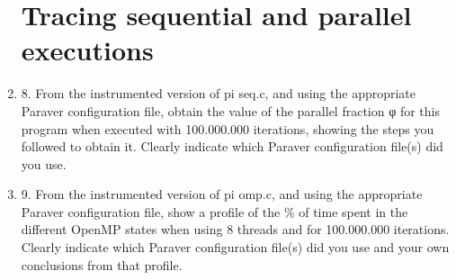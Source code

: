 \documentclass[12pt]{article}
\begin{document}
\begin{enumerate}
\section* {Tracing sequential and parallel executions}


\item[] 8. From the instrumented version of pi seq.c, and using the appropriate Paraver configuration
file, obtain the value of the parallel fraction φ for this program when executed with 100.000.000
iterations, showing the steps you followed to obtain it. Clearly indicate which Paraver configuration
file(s) did you use.



\item[] 9. From the instrumented version of pi omp.c, and using the appropriate Paraver configuration file,
show a profile of the \% of time spent in the different OpenMP states when using 8 threads and for
100.000.000 iterations. Clearly indicate which Paraver configuration file(s) did you use and your
own conclusions from that profile.




\end{enumerate}
\end{document}
